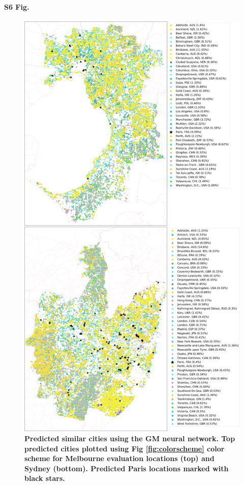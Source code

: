 \documentclass[10pt,letterpaper]{article}
\begin{document}
\paragraph*{S6 Fig.}
\begin{figure}[!htbp]
\centering   
\includegraphics[scale=0.16]{Images/PlosOne/Fig6.png}  
\caption{\bf Predicted similar cities using the GM neural network. Top predicted cities plotted using Fig \ref{fig:colorscheme} color scheme for Melbourne evaluation locations (top) and Sydney (bottom). Predicted Paris locations marked with black stars.}    
 \label{fig:melmaps}  
\end{figure} 
\end{document}
